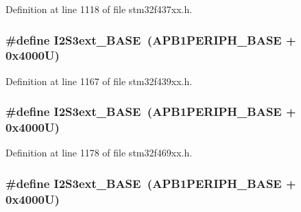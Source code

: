 Definition at line 1118 of file stm32f437xx.\+h.

\subsubsection[{\texorpdfstring{I2\+S3ext\+\_\+\+B\+A\+SE}{I2S3ext_BASE}}]{\setlength{\rightskip}{0pt plus 5cm}\#define I2\+S3ext\+\_\+\+B\+A\+SE~({\bf A\+P\+B1\+P\+E\+R\+I\+P\+H\+\_\+\+B\+A\+SE} + 0x4000\+U)}\hypertarget{group___peripheral__memory__map_ga89b61d6e6b09e94f3fccb7bef34e0263}{}\label{group___peripheral__memory__map_ga89b61d6e6b09e94f3fccb7bef34e0263}


Definition at line 1167 of file stm32f439xx.\+h.

\subsubsection[{\texorpdfstring{I2\+S3ext\+\_\+\+B\+A\+SE}{I2S3ext_BASE}}]{\setlength{\rightskip}{0pt plus 5cm}\#define I2\+S3ext\+\_\+\+B\+A\+SE~({\bf A\+P\+B1\+P\+E\+R\+I\+P\+H\+\_\+\+B\+A\+SE} + 0x4000\+U)}\hypertarget{group___peripheral__memory__map_ga89b61d6e6b09e94f3fccb7bef34e0263}{}\label{group___peripheral__memory__map_ga89b61d6e6b09e94f3fccb7bef34e0263}


Definition at line 1178 of file stm32f469xx.\+h.

\subsubsection[{\texorpdfstring{I2\+S3ext\+\_\+\+B\+A\+SE}{I2S3ext_BASE}}]{\setlength{\rightskip}{0pt plus 5cm}\#define I2\+S3ext\+\_\+\+B\+A\+SE~({\bf A\+P\+B1\+P\+E\+R\+I\+P\+H\+\_\+\+B\+A\+SE} + 0x4000\+U)}\hypertarget{group___peripheral__memory__map_ga89b61d6e6b09e94f3fccb7bef34e0263}{}\label{group___peripheral__memory__map_ga89b61d6e6b09e94f3fccb7bef34e0263}


